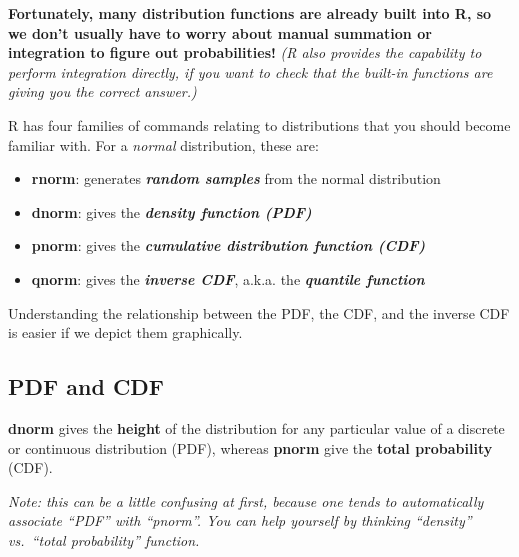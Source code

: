 \documentclass[
]{article}
\providecommand{\tightlist}{%
  \setlength{\itemsep}{0pt}\setlength{\parskip}{0pt}}
\begin{document}
\textbf{Fortunately, many distribution functions are already built into
R, so we don't usually have to worry about manual summation or
integration to figure out probabilities!} \emph{(R also provides the
capability to perform integration directly, if you want to check that
the built-in functions are giving you the correct answer.)}

R has four families of commands relating to distributions that you
should become familiar with. For a \emph{normal} distribution, these
are:

\begin{itemize}
\tightlist
\item
  \textbf{rnorm}: generates \textbf{\emph{random samples}} from the
  normal distribution
\item
  \textbf{dnorm}: gives the \textbf{\emph{density function (PDF)}}
\item
  \textbf{pnorm}: gives the \textbf{\emph{cumulative distribution
  function (CDF)}}
\item
  \textbf{qnorm}: gives the \textbf{\emph{inverse CDF}}, a.k.a. the
  \textbf{\emph{quantile function}}
\end{itemize}

Understanding the relationship between the PDF, the CDF, and the inverse
CDF is easier if we depict them graphically.

\hypertarget{pdf-and-cdf}{%
\subsection{PDF and CDF}\label{pdf-and-cdf}}

\textbf{dnorm} gives the \textbf{height} of the distribution for any
particular value of a discrete or continuous distribution (PDF), whereas
\textbf{pnorm} give the \textbf{total probability} (CDF).

\emph{Note: this can be a little confusing at first, because one tends
to automatically associate ``PDF'' with ``pnorm''. You can help yourself
by thinking ``density'' vs.~``total probability'' function.}
\end{document}
